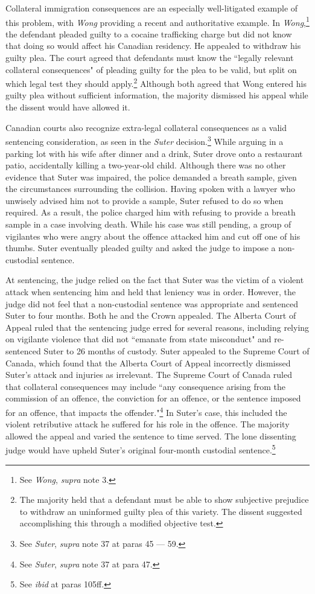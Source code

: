 Collateral immigration consequences are an especially well-litigated example of this problem, with \textit{Wong} providing a recent and authoritative example. In \textit{Wong},\footnote{See \textit{Wong}, \textit{supra} note 3.} the defendant pleaded guilty to a cocaine trafficking charge but did not know that doing so would affect his Canadian residency. He appealed to withdraw his guilty plea. The court agreed that defendants must know the ``legally relevant collateral consequences" of pleading guilty for the plea to be valid, but split on which legal test they should apply.\footnote{The majority held that a defendant must be able to show subjective prejudice to withdraw an uninformed guilty plea of this variety. The dissent suggested accomplishing this through a modified objective test.} Although both agreed that Wong entered his guilty plea without sufficient information, the majority dismissed his appeal while the dissent would have allowed it.

Canadian courts also recognize extra-legal collateral consequences as a valid sentencing consideration, as seen in the \textit{Suter} decision.\footnote{See \textit{Suter}, \textit{supra} note 37 at paras 45 — 59.} While arguing in a parking lot with his wife after dinner and a drink, Suter drove onto a restaurant patio, accidentally killing a two-year-old child. Although there was no other evidence that Suter was impaired, the police demanded a breath sample, given the circumstances surrounding the collision. Having spoken with a lawyer who unwisely advised him not to provide a sample, Suter refused to do so when required. As a result, the police charged him with refusing to provide a breath sample in a case involving death. While his case was still pending, a group of vigilantes who were angry about the offence attacked him and cut off one of his thumbs. Suter eventually pleaded guilty and asked the judge to impose a non-custodial sentence.

At sentencing, the judge relied on the fact that Suter was the victim of a violent attack when sentencing him and held that leniency was in order. However, the judge did not feel that a non-custodial sentence was appropriate and sentenced Suter to four months. Both he and the Crown appealed. The Alberta Court of Appeal ruled that the sentencing judge erred for several reasons, including relying on vigilante violence that did not ``emanate from state misconduct" and re-sentenced Suter to 26 months of custody. Suter appealed to the Supreme Court of Canada, which found that the Alberta Court of Appeal incorrectly dismissed Suter's attack and injuries as irrelevant. The Supreme Court of Canada ruled that collateral consequences may include ``any consequence arising from the commission of an offence, the conviction for an offence, or the sentence imposed for an offence, that impacts the offender."\footnote{See \textit{Suter}, \textit{supra} note 37 at para 47.} In Suter's case, this included the violent retributive attack he suffered for his role in the offence. The majority allowed the appeal and varied the sentence to time served. The lone dissenting judge would have upheld Suter's original four-month custodial sentence.\footnote{See \textit{ibid} at paras 105ff.}

